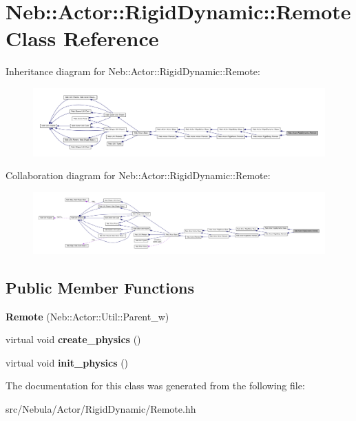 \hypertarget{classNeb_1_1Actor_1_1RigidDynamic_1_1Remote}{\section{\-Neb\-:\-:\-Actor\-:\-:\-Rigid\-Dynamic\-:\-:\-Remote \-Class \-Reference}
\label{classNeb_1_1Actor_1_1RigidDynamic_1_1Remote}
}


\-Inheritance diagram for \-Neb\-:\-:\-Actor\-:\-:\-Rigid\-Dynamic\-:\-:\-Remote\-:\nopagebreak
\begin{figure}[H]
\begin{center}
\leavevmode
\includegraphics[width=350pt]{classNeb_1_1Actor_1_1RigidDynamic_1_1Remote__inherit__graph}
\end{center}
\end{figure}


\-Collaboration diagram for \-Neb\-:\-:\-Actor\-:\-:\-Rigid\-Dynamic\-:\-:\-Remote\-:\nopagebreak
\begin{figure}[H]
\begin{center}
\leavevmode
\includegraphics[width=350pt]{classNeb_1_1Actor_1_1RigidDynamic_1_1Remote__coll__graph}
\end{center}
\end{figure}
\subsection*{\-Public \-Member \-Functions}
\begin{DoxyCompactItemize}
\item 
\hypertarget{classNeb_1_1Actor_1_1RigidDynamic_1_1Remote_a56c86bee20a8e2ff2ca60d3f05560a8a}{{\bfseries \-Remote} (\-Neb\-::\-Actor\-::\-Util\-::\-Parent\-\_\-w)}\label{classNeb_1_1Actor_1_1RigidDynamic_1_1Remote_a56c86bee20a8e2ff2ca60d3f05560a8a}

\item 
\hypertarget{classNeb_1_1Actor_1_1RigidDynamic_1_1Remote_adc0455849e38e5be3265901c3f5d0a51}{virtual void {\bfseries create\-\_\-physics} ()}\label{classNeb_1_1Actor_1_1RigidDynamic_1_1Remote_adc0455849e38e5be3265901c3f5d0a51}

\item 
\hypertarget{classNeb_1_1Actor_1_1RigidDynamic_1_1Remote_a3267b7b3275b4bf768ce21eea4155b26}{virtual void {\bfseries init\-\_\-physics} ()}\label{classNeb_1_1Actor_1_1RigidDynamic_1_1Remote_a3267b7b3275b4bf768ce21eea4155b26}

\end{DoxyCompactItemize}


\-The documentation for this class was generated from the following file\-:\begin{DoxyCompactItemize}
\item 
src/\-Nebula/\-Actor/\-Rigid\-Dynamic/\-Remote.\-hh\end{DoxyCompactItemize}
